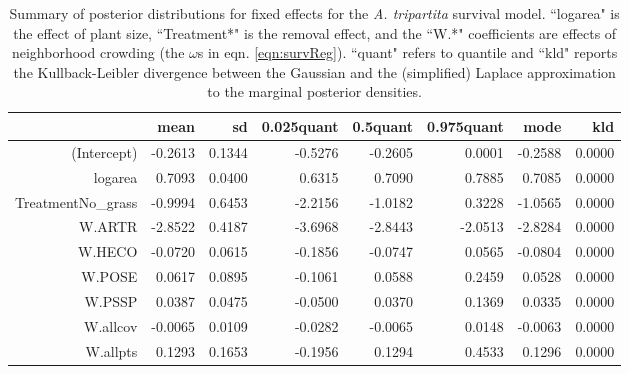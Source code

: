 \documentclass[11pt]{article}
\begin{document}
\begin{table}[ht]
\centering
\caption{Summary of posterior distributions for fixed effects for the \textit{A. tripartita} survival model. ``logarea" is the effect of plant size, ``Treatment*" is the removal effect, and the ``W.*" coefficients are effects of neighborhood crowding (the $\omega$s in eqn. \ref{eqn:survReg}). ``quant" refers to quantile and ``kld" reports the Kullback-Leibler divergence between the Gaussian and the (simplified) Laplace approximation to the marginal posterior densities. } 
\label{ARTRsurvival}
\begin{tabular}{rrrrrrrr}
  \hline
 & mean & sd & 0.025quant & 0.5quant & 0.975quant & mode & kld \\ 
  \hline
(Intercept) & -0.2613 & 0.1344 & -0.5276 & -0.2605 & 0.0001 & -0.2588 & 0.0000 \\ 
  logarea & 0.7093 & 0.0400 & 0.6315 & 0.7090 & 0.7885 & 0.7085 & 0.0000 \\ 
  TreatmentNo\_grass & -0.9994 & 0.6453 & -2.2156 & -1.0182 & 0.3228 & -1.0565 & 0.0000 \\ 
  W.ARTR & -2.8522 & 0.4187 & -3.6968 & -2.8443 & -2.0513 & -2.8284 & 0.0000 \\ 
  W.HECO & -0.0720 & 0.0615 & -0.1856 & -0.0747 & 0.0565 & -0.0804 & 0.0000 \\ 
  W.POSE & 0.0617 & 0.0895 & -0.1061 & 0.0588 & 0.2459 & 0.0528 & 0.0000 \\ 
  W.PSSP & 0.0387 & 0.0475 & -0.0500 & 0.0370 & 0.1369 & 0.0335 & 0.0000 \\ 
  W.allcov & -0.0065 & 0.0109 & -0.0282 & -0.0065 & 0.0148 & -0.0063 & 0.0000 \\ 
  W.allpts & 0.1293 & 0.1653 & -0.1956 & 0.1294 & 0.4533 & 0.1296 & 0.0000 \\ 
   \hline
\end{tabular}
\end{table}
\end{document}
